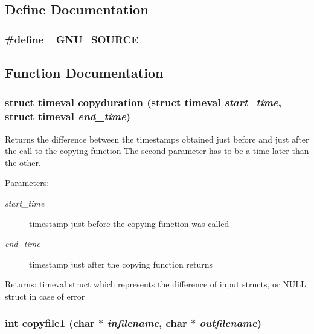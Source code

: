\subsection{Define Documentation}
\subsubsection{\setlength{\rightskip}{0pt plus 5cm}\#define \_\-GNU\_\-SOURCE}\label{cptest_8c_53abf256730d533302d1910e5fb61efe}




\subsection{Function Documentation}
\subsubsection{\setlength{\rightskip}{0pt plus 5cm}struct timeval copyduration (struct timeval {\em start\_\-time}, struct timeval {\em end\_\-time})}\label{cptest_8c_6983c07625f59199b36b6933782a4cf7}


Returns the difference between the timestamps obtained just before and just after the call to the copying function The second parameter has to be a time later than the other. \begin{Desc}
\item[Parameters:]
\begin{description}
\item[{\em start\_\-time}]timestamp just before the copying function was called \item[{\em end\_\-time}]timestamp just after the copying function returns \end{description}
\end{Desc}
\begin{Desc}
\item[Returns:]timeval struct which represents the difference of input structs, or NULL struct in case of error \end{Desc}
\subsubsection{\setlength{\rightskip}{0pt plus 5cm}int copyfile1 (char $\ast$ {\em infilename}, char $\ast$ {\em outfilename})}\label{cptest_8c_97d29821b578fd3c9ea2482e77bebfc5}


